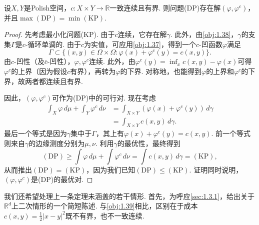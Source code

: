\begin{theorem}\label{obj:1.39}
设$X,Y$是Polish空间，$c:X\times Y\to\mathbb R$一致连续且有界. 则问题(DP)存在解$(\varphi,\varphi^c)$，并且$\max(\mathrm{DP})=\min(\mathrm{KP})$.
\end{theorem}
\begin{proof}
先考虑最小化问题(KP). 由于$c$连续，它存在解$\gamma$. 此外，由\autoref{obj:1.38}，$\gamma$的支集$\Gamma$是$c$-循环单调的. 由于$c$为实值，可应用\autoref{obj:1.37}，得到一个$c$-凹函数$\varphi$满足
\[
\Gamma\subset\{(x,y)\in\Omega\times\Omega:\varphi(x)+\varphi^c(y)=c(x,y)\}.
\]
由$c$-凹性（及$\bar c$-凹性），$\varphi,\varphi^c$连续. 此外，由$\varphi^c(y)=\inf_x c(x,y)-\varphi(x)$可得$\varphi^c$的上界（因为假设$c$有界），再转为$\varphi$的下界. 对称地，也能得到$\varphi$的上界和$\varphi^c$的下界，故两者都连续且有界.

因此，$(\varphi,\varphi^c)$可作为(DP)中的可行对. 现在考虑
\begin{equation*}
\begin{aligned}
\int_X\varphi\,d\mu+\int_Y\varphi^c\,d\nu
&=\int_{X\times Y}(\varphi(x)+\varphi^c(y))\,d\gamma\\
&=\int_{X\times Y}c(x,y)\,d\gamma.
\end{aligned}
\end{equation*}
最后一个等式是因为$\gamma$集中于$\Gamma$，其上有$\varphi(x)+\varphi^c(y)=c(x,y)$. 前一个等式则来自$\gamma$的边缘测度分别为$\mu,\nu$. 利用$\gamma$的最优性，最终得到
\[
(\mathrm{DP})\ge\int\varphi\,d\mu+\int\varphi^c\,d\nu
=\int c(x,y)\,d\gamma=(\mathrm{KP}),
\]
从而推出$(\mathrm{DP})=(\mathrm{KP})$，因为我们已知$(\mathrm{DP})\le(\mathrm{KP})$. 证明同时说明，$(\varphi,\varphi^c)$是(DP)的最优对.
\end{proof}

我们还希望处理上一条定理未涵盖的若干情形. 首先，为呼应\autoref{sec:1.3.1}，给出关于$\mathbb R^d$上二次情形的一个简短陈述. 与\autoref{obj:1.39}相比，区别在于成本$c(x,y)=\frac12|x-y|^2$既不有界，也不一致连续.


